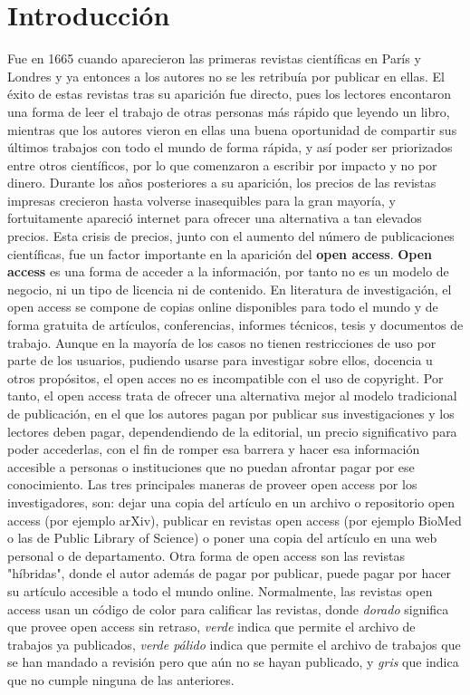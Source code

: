 \section{Introducción}

Fue en 1665 cuando aparecieron las primeras revistas científicas en París y Londres y ya entonces a los autores no se les retribuía por publicar en ellas. El éxito de estas revistas tras su aparición fue directo, pues los lectores encontaron una forma de leer el trabajo de otras personas más rápido que leyendo un libro,  
mientras que los autores vieron en ellas una buena oportunidad de compartir sus últimos trabajos con todo el mundo de forma rápida, y así poder ser priorizados entre otros científicos, por lo que comenzaron a escribir por impacto y no por dinero. Durante los años posteriores a su aparición, los precios de las revistas impresas crecieron hasta volverse inasequibles para la gran mayoría, y fortuitamente apareció internet para ofrecer una alternativa a tan elevados precios. Esta crisis de precios, junto con el aumento del número de publicaciones científicas, fue un factor importante en la aparición del \textbf{open access}.
\newline
\newline
\textbf{Open access} es una forma de acceder a la información, por tanto no es un modelo de negocio, ni un tipo de licencia ni de contenido. En literatura de investigación, el open access se compone de copias online disponibles para todo el mundo y de forma gratuita de artículos, conferencias, informes técnicos, tesis y documentos de trabajo. Aunque en la mayoría de los casos no tienen restricciones de uso por parte de los usuarios, pudiendo usarse para investigar sobre ellos, docencia u otros propósitos, el open acces no es incompatible con el uso de copyright.\newline 
Por tanto, el open access trata de ofrecer una alternativa mejor al modelo tradicional de publicación, en el que los autores pagan por publicar sus investigaciones y los lectores deben pagar, dependendiendo de la editorial, un precio significativo para poder accederlas, con el fin de romper esa barrera y hacer esa información accesible a personas o instituciones que no puedan afrontar pagar por ese conocimiento.
\newline
Las tres principales maneras de proveer open access por los investigadores, son: dejar una copia del artículo en un archivo o repositorio open access (por ejemplo arXiv), publicar en revistas open access (por ejemplo BioMed o las de Public Library of Science) o poner una copia del artículo en una web personal o de departamento. Otra forma de open access son las revistas "híbridas", donde el autor además de pagar por publicar, puede pagar por hacer su artículo accesible a todo el mundo online. Normalmente, las revistas open access usan un código de color para calificar las revistas, donde \textit{dorado} significa que provee open access sin retraso, \textit{verde} indica que permite el archivo de trabajos ya publicados, \textit{verde pálido} indica que permite el archivo de trabajos que se han mandado a revisión pero que aún no se hayan publicado, y \textit{gris} que indica que no cumple ninguna de las anteriores.


